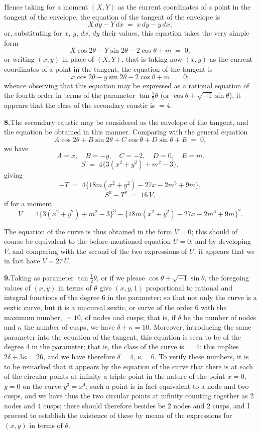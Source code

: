 \documentclass[11pt]{article}
\begin{document}
Hence taking for a moment $(X, Y)$ as the current coordinates of a point in the tangent of the envelope, the equation of the tangent of the envelope is
\[
X\,dy - Y\,dx \;=\; x\,dy - y\,dx,
\]
or, substituting for $x$, $y$, $dx$, $dy$ their values, this equation takes the very simple form
\[
X\cos 2\theta - Y\sin 2\theta - 2\cos\theta + m \;=\; 0,
\]
or writing $(x, y)$ in place of $(X, Y)$, that is taking now $(x, y)$ as the current coordinates of a point in the tangent, the equation of the tangent is
\[
x\cos 2\theta - y\sin 2\theta - 2\cos\theta + m \;=\; 0;
\]
whence observing that this equation may be expressed as a rational equation of the fourth order in terms of the parameter $\tan\tfrac{1}{2}\theta$ (or $\cos\theta + \sqrt{-1}\sin\theta$), it appears that the class of the secondary caustic is $=4$.

\textbf{8.}\quad The secondary caustic may be considered as the envelope of the tangent, and the equation be obtained in this manner. Comparing with the general equation
\[
A\cos 2\theta + B\sin 2\theta + C\cos\theta + D\sin\theta + E \;=\; 0,
\]
we have
\[
A = x,\quad B = -y,\quad C = -2,\quad D = 0,\quad E = m.
\]
\[
S \;=\; 4\bigl\{3(x^{2} + y^{2}) + m^{2} - 3\bigr\},
\]
giving
\[
-T \;=\; 4\bigl\{18 m(x^{2} + y^{2}) - 27 x - 2 m^{3} + 9 m\bigr\},
\]
\[
S^{3} - T^{2} \;=\; 16\,V,
\]
if for a moment
\[
V \;=\; 4\bigl\{3(x^{2} + y^{2}) + m^{2} - 3\bigr\}^{3} - \bigl\{18 m(x^{2} + y^{2}) - 27 x - 2 m^{3} + 9 m\bigr\}^{2}.
\]

The equation of the curve is thus obtained in the form $V = 0$; this should of course be equivalent to the before-mentioned equation $U = 0$; and by developing $V$, and comparing with the second of the two expressions of $U$, it appears that we in fact have $V = 27\,U$.

\textbf{9.}\quad Taking as parameter $\tan\tfrac{1}{2}\theta$, or if we please $\cos\theta + \sqrt{-1}\sin\theta$, the foregoing values of $(x, y)$ in terms of $\theta$ give $(x, y, 1)$ proportional to rational and integral functions of the degree 6 in the parameter; so that not only the curve is a sextic curve, but it is a unicursal sextic, or curve of the order 6 with the maximum number, $=10$, of nodes and cusps; that is, if $\delta$ be the number of nodes and $\kappa$ the number of cusps, we have $\delta + \kappa = 10$. Moreover, introducing the same parameter into the equation of the tangent, this equation is seen to be of the degree 4 in the parameter; that is, the class of the curve is $=4$: this implies $2\delta + 3\kappa = 26$, and we have therefore $\delta = 4$, $\kappa = 6$. To verify these numbers, it is to be remarked that it appears by the equation of the curve that there is at each of the circular points at infinity a triple point in the nature of the point $x = 0$, $y = 0$ on the curve $y^{3} = x^{4}$; such a point is in fact equivalent to a node and two cusps, and we have thus the two circular points at infinity counting together as 2 nodes and 4 cusps; there should therefore besides be 2 nodes and 2 cusps, and I proceed to establish the existence of these by means of the expressions for $(x, y)$ in terms of $\theta$.
\end{document}
